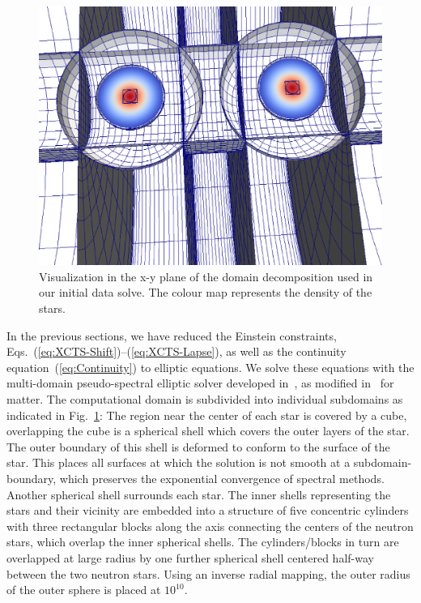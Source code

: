 {\begin{figure}
\includegraphics[width=0.95\columnwidth,trim=0 185 0 0, clip=true]{chap2/TheDomain}
\caption[Visualization of the initial data domain decomposition.]{\label{fig:TheDomain} Visualization in the x-y plane of the
  domain decomposition used in our initial data solve. The colour map
  represents the density of the stars.  }
\end{figure}

In the previous sections, we have reduced the Einstein
  constraints, Eqs.~(\ref{eq:XCTS-Shift})--(\ref{eq:XCTS-Lapse}), as
  well as the continuity equation~(\ref{eq:Continuity}) to elliptic
  equations.  We solve these equations with the multi-domain
  pseudo-spectral elliptic solver developed in~\cite{Pfeiffer2003}, as
  modified in~\cite{FoucartEtAl:2008} for matter.  The
  computational domain is subdivided into individual subdomains as
  indicated in Fig.~\ref{fig:TheDomain}: The region near the center of
  each star is covered by a cube, overlapping the cube is a spherical
  shell which covers the outer layers of the star.  The outer boundary
  of this shell is deformed to conform to the surface of the star.
  This places all surfaces at which the solution is not smooth at a
  subdomain-boundary, which preserves the exponential convergence of
  spectral methods.  
  Another spherical shell surrounds each star.  The
  inner shells representing the stars and their vicinity are embedded
  into a structure of five concentric cylinders with three rectangular
  blocks along the axis connecting the centers of the neutron stars,
  which overlap the inner spherical shells.  The cylinders/blocks in
  turn are overlapped at large radius by one further spherical shell
  centered half-way between the two neutron stars.  Using an inverse radial mapping, the outer radius of the outer sphere is placed at $10^{10}$.
 
}
